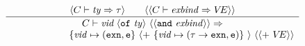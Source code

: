\begin{equation}	%
\label{exnbind1-rule}
\frac{\langle\C\ts\ty\ra\tau\rangle\qquad
      \langle\langle\C\ts\exnbind\ra\VE\rangle\rangle }
     {\begin{array}{c}
      \C\ts\longexnbinda\ra\\
      \qquad\qquad\qquad\{\vid\mapsto(\EXCN,\estatus\}\
      \langle +\ \{\vid\mapsto(\tau\rightarrow\EXCN,\estatus)\}\ \rangle\
      \langle\langle +\ \VE\rangle\rangle
      \end{array}
     }\index{30.3}
\end{equation}


